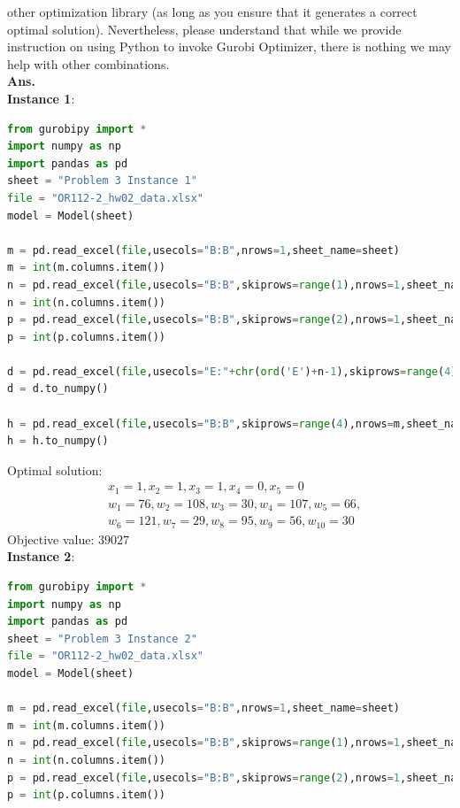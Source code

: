 \documentclass[12pt]{article}
\begin{document}
\begin{enumerate}
\begin{enumerate}
                        other optimization library (as long as you ensure that it generates a correct optimal solution).
                        Nevertheless, please understand that while we provide instruction on using Python to invoke
                        Gurobi Optimizer, there is nothing we may help with other combinations.\\
                        \textbf{Ans.}\\
                        \textbf{Instance 1}:
                        \begin{lstlisting}[language=Python]
from gurobipy import *
import numpy as np
import pandas as pd
sheet = "Problem 3 Instance 1"
file = "OR112-2_hw02_data.xlsx"
model = Model(sheet)

m = pd.read_excel(file,usecols="B:B",nrows=1,sheet_name=sheet)
m = int(m.columns.item())
n = pd.read_excel(file,usecols="B:B",skiprows=range(1),nrows=1,sheet_name=sheet)
n = int(n.columns.item())
p = pd.read_excel(file,usecols="B:B",skiprows=range(2),nrows=1,sheet_name=sheet)
p = int(p.columns.item())

d = pd.read_excel(file,usecols="E:"+chr(ord('E')+n-1),skiprows=range(4),nrows=m,sheet_name=sheet)
d = d.to_numpy()

h = pd.read_excel(file,usecols="B:B",skiprows=range(4),nrows=m,sheet_name=sheet)
h = h.to_numpy()
                        \end{lstlisting}
                        Optimal solution:
                        \begin{align*}
                               & x_1 = 1,x_2 = 1,x_3 = 1,x_4 = 0,x_5 = 0              \\
                               & w_1 = 76, w_2 = 108, w_3 = 30, w_4 = 107, w_5 = 66,  \\
                               & w_6 = 121, w_7 = 29, w_8 = 95, w_9 = 56, w_{10} = 30
                        \end{align*}
                        Objective value:  $39027$\\
                        \textbf{Instance 2}:
                        \begin{lstlisting}[language=Python]
from gurobipy import *
import numpy as np
import pandas as pd
sheet = "Problem 3 Instance 2"
file = "OR112-2_hw02_data.xlsx"
model = Model(sheet)

m = pd.read_excel(file,usecols="B:B",nrows=1,sheet_name=sheet)
m = int(m.columns.item())
n = pd.read_excel(file,usecols="B:B",skiprows=range(1),nrows=1,sheet_name=sheet)
n = int(n.columns.item())
p = pd.read_excel(file,usecols="B:B",skiprows=range(2),nrows=1,sheet_name=sheet)
p = int(p.columns.item())


\end{lstlisting}
\end{enumerate}
\end{enumerate}
\end{document}
